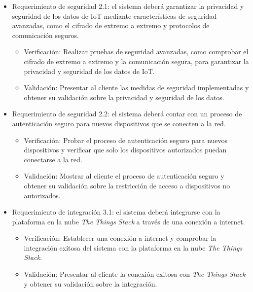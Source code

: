 \documentclass[
11pt, %
]{charter}
\begin{document}
\begin{itemize}
\item Requerimiento de seguridad 2.1: el sistema deberá garantizar la privacidad y seguridad de los datos de IoT mediante características de seguridad avanzadas, como el cifrado de extremo a extremo y protocolos de comunicación seguros.
\begin{itemize}
\item Verificación: Realizar pruebas de seguridad avanzadas, como comprobar el cifrado de extremo a extremo y la comunicación segura, para garantizar la privacidad y seguridad de los datos de IoT.
\item Validación: Presentar al cliente las medidas de seguridad implementadas y obtener su validación sobre la privacidad y seguridad de los datos.
\end{itemize}
\end{itemize}

\begin{itemize}
\item Requerimiento de seguridad 2.2: el sistema deberá contar con un proceso de autenticación seguro para nuevos dispositivos que se conecten a la red.
\begin{itemize}
\item Verificación: Probar el proceso de autenticación seguro para nuevos dispositivos y verificar que solo los dispositivos autorizados puedan conectarse a la red.
\item Validación: Mostrar al cliente el proceso de autenticación seguro y obtener su validación sobre la restricción de acceso a dispositivos no autorizados.
\end{itemize}
\end{itemize}

\begin{itemize}
\item Requerimiento de integración 3.1: el sistema deberá integrarse con la plataforma en la nube \emph{The Things Stack} a través
de una conexión a internet.
\begin{itemize}
\item Verificación: Establecer una conexión a internet y comprobar la integración exitosa del sistema con la plataforma en la nube \emph{The Things Stack}.
\item Validación: Presentar al cliente la conexión exitosa con \emph{The Things Stack} y obtener su validación sobre la integración.
\end{itemize}
\end{itemize}
\end{document}
